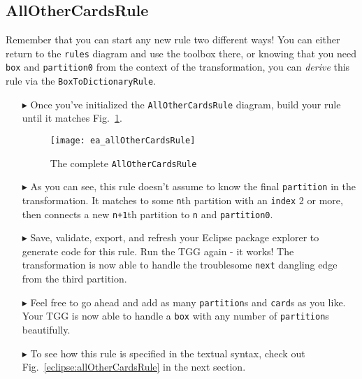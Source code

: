 \newpage
\hypertarget{allCards vis}{}
\subsection{AllOtherCardsRule}
\visHeader

Remember that you can start any new rule two different ways! You can either return to the \texttt{rules} diagram and use the toolbox
there, or knowing that you need \texttt{box} and \texttt{partition0} from the context of the transformation, you can \emph{derive} this rule via the
\texttt{BoxToDictionaryRule}.

\begin{itemize}

\item[$\blacktriangleright$] Once you've initialized the \texttt{AllOtherCardsRule} diagram, build your rule until it matches
Fig.~\ref{fig:ea_allOtherCardsRule}.

\begin{figure}[htbp]
\begin{center}
  \texttt{[image: ea\_allOtherCardsRule]}
  \caption{The complete \texttt{AllOtherCardsRule}}
  \label{fig:ea_allOtherCardsRule}
\end{center}
\end{figure}

\item[$\blacktriangleright$] As you can see, this rule doesn't assume to know the final \texttt{partition} in the transformation. It matches to some
\texttt{n}th partition with an \texttt{index} 2 or more, then connects a new \texttt{n+1}th partition to \texttt{n} and \texttt{partition0}. 

\item[$\blacktriangleright$] Save, validate, export, and refresh your Eclipse package explorer to generate code for this rule. Run the TGG again - it works! The
transformation is now able to handle the troublesome \texttt{next} dangling edge from the third partition.

\item[$\blacktriangleright$] Feel free to go ahead and add as many \texttt{partition}s and \texttt{card}s as you like. Your TGG is now able to handle a
\texttt{box} with any number of \texttt{partition}s beautifully. 

\item[$\blacktriangleright$] To see how this rule is specified in the textual syntax, check out Fig.~\ref{eclipse:allOtherCardsRule} in the next
section.

\end{itemize}
